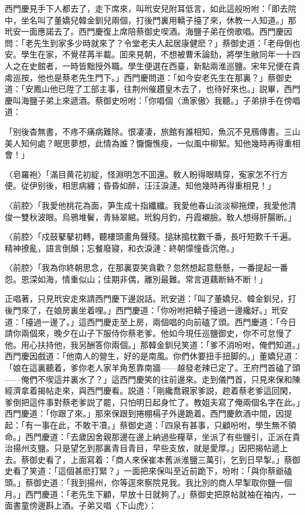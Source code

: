 西門慶見手下人都去了，走下席來，叫玳安兒附耳低言，如此這般吩咐：「即去院中，坐名叫了董嬌兒韓金釧兒兩個，打後門裏用轎子擡了來，休教一人知道。」那玳安一面應諾去了。西門慶復上席陪蔡御史喫酒。海鹽子弟在傍歌唱。西門慶因問：「老先生到家多少時就來了？令堂老夫人起居康健麽？」蔡御史道：「老母倒也安。學生在家，不覺荏苒半載。囬來見朝，不想被曹禾論劾，將學生敝同年一十四人之在史館者，一時皆黜授外職。學生便選在西臺，新點兩淮巡鹽。宋年兄便在貴䖏巡按，他也是蔡老先生門下。」西門慶問道：「如今安老先生在那裏？」蔡御史道：「安鳳山他已陞了工部主事，往荆州催趲皇木去了，也待好來也。」説畢，西門慶叫海鹽子弟上來遞酒。蔡御史吩咐：「你唱個〈漁家傲〉我聽。」子弟排手在傍唱道：

\begin{myquote}
「别後杳無書，不疼不痛病難除。恨凄凄，旅館有誰相知，魚沉不見鴈傳書。三山美人知何處？眠思夢想，此情為誰？懨懨憔瘦，一似風中柳絮。知他幾時再得重相會！」

{\markfont〈皂羅袍〉}「滿目黄花初綻，怪淵明怎不囬還。敎人盼得眼睛穿，寃家怎不行方便。従伊别後，相思病纏；昏昏如醉，汪汪淚漣。知他幾時再得重相見！」

{\markfont〈前腔〉}「我愛他桃花為面，笋生成十指纖纖。我愛他春山淡淡柳拖煙，我愛他清俊一雙秋波眼。烏鴉堆鬢，青絲翠綰。玳鈎月釣，丹霞襯臉。敎人想得肝腸断。」

{\markfont〈前腔〉}「戍鼓鼕鼕初轉，聽樓頭畫角聲殘。搥牀搗枕數千番，長吁短歎千千遍。精神撩亂，語言倒顛；忘餐廢寢，和衣淚漣：終朝懞憧昏沉倦。」

{\markfont〈前腔〉}「我為你終朝思念，在那裏耍笑貪歡？忽然想起意懸懸，一番提起一番怨。恩深如海，情重似山；佳期非偶，離別最難。常言道藕断絲不断！」
\end{myquote}

正唱著，只見玳安走來請西門慶下邊説話。玳安道：「叫了董嬌兒、韓金釧兒，打後門來了，在娘房裏坐着哩。」西門慶道：「你吩咐把轎子擡過一邊纔好。」玳安道：「擡過一邊了。」這西門慶走至上房，兩個唱的向前磕了頭。西門慶道：「今日請你兩個來，晚夕在山子下服侍你蔡老爹。他如今現任巡鹽御史，你不可怠慢了他。用心扶持他，我另酬答你兩個。」那韓金釧兒笑道：「爹不消吩咐，俺們知道。」西門慶因戲道：「他南人的營生，好的是南風。你們休要扭手扭脚的。」董嬌兒道：「娘在這裏聽着，爹你老人家羊角葱靠南牆——越發老辣已定了。王府門首磕了頭——俺們不喫這井裏水了？」這西門慶笑的往前邊來。走到儀門首，只見來保和陳經濟拿着揭帖走來，與西門慶看。説道：「剛纔喬親家爹説，趂着蔡老爹這回閑，爹倒把這件事對蔡老爹説了罷，只怕明日起身忙了。教姐夫寫了俺兩個名字在此。」西門慶道：「你跟了來。」那來保跟到捲棚槅子外邊跪着。西門慶飲酒中間，因提起：「有一事在此，不敢干凟。」蔡御史道：「四泉有甚事，只顧吩咐，學生無不領命。」西門慶道：「去歲因舍親那邊在邊上納過些糧草，坐派了有些鹽引，正派在貴治揚州支鹽。只是望乞到那裏青目青目，早些支放，就是愛厚。」因把揭帖遞上去。蔡御史看了，上面寫着：「商人來保崔本舊派淮鹽三萬引，乞到日早掣。」蔡御史看了笑道：「這個甚麽打緊？」一面把來保叫至近前跪下，吩咐：「與你蔡爺磕頭。」蔡御史道：「我到揚州，你等逕來察院見我。我比別的商人早掣取你鹽一個月。」西門慶道：「老先生下顧，早放十日就夠了。」蔡御史把原帖就袖在袖内，一面書童傍邊斟上酒。子弟又唱〈下山虎〉：

